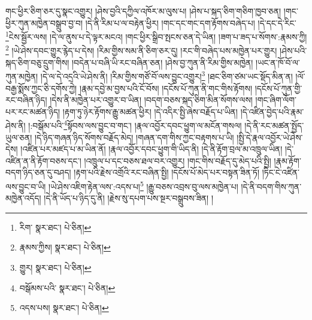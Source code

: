 གང་ཕྱིར་ཅིག་ཅར་དུ་སྣང་འགྱུར། །ཤེས་བྱའི་དཀྱིལ་འཁོར་མ་ལུས་པ། །ཤེས་པ་སྐད་ཅིག་གཅིག་ཁྱབ་ཅན། །གང་ཕྱིར་ཀུན་མཁྱེན་བསྒྲུབ་བྱ་བ། །དེ་ནི་རིམ་པ་ལ་བརྟེན་ཕྱིར། །གང་དང་གང་དག་རྟོགས་བཞེད་པ། །དེ་དང་དེ་རིང་\footnote{རིག་  སྣར་ཐང་།  པེ་ཅིན། }ངེས་སྦྱོར་ལས། །དེ་ལ་ནུས་པ་དེ་ལྟར་མངའ། །གང་ཕྱིར་སྒྲིབ་སྤངས་ཅན་དེ་ཡིན། །ཟག་པ་ཟད་པ་སོགས་:རྣམས་ཀྱི།\footnote{རྣམས་ཀྱིས།  སྣར་ཐང་།  པེ་ཅིན། } །ཡེ་ཤེས་དབང་གྱུར་རྙེད་པ་དེས། །རིམ་གྱིས་སམ་ནི་ཅིག་ཅར་དུ། །རང་གི་བཞེད་པས་མཁྱེན་པར་གྱུར། །ཤེས་པའི་སྐད་ཅིག་བཅུ་དྲུག་གིས། །བདེན་པ་བཞི་ཡི་རང་བཞིན་ཅན། །ཤེས་བྱ་ཀུན་ནི་རིམ་གྱིས་མཁྱེན། །ཡང་ན་ཁོ་བོ་ལ་ཀུན་མཁྱེན། །དེ་ལ་དེ་འདྲའི་ཡེ་ཤེས་ནི། །རིམ་གྱིས་གཙོ་བོ་ལས་བྱུང་འགྱུར།\footnote{གྱུར།  སྣར་ཐང་།  པེ་ཅིན། } །ཐང་ཅིག་ཙམ་ཡང་སྡོད་མིན་ན། །ལོ་བརྒྱ་སྨོས་ཀྱང་ཅི་དགོས་ཀྱེ། །རྣམ་དབྱེ་མ་བྱས་པའི་ངོ་བོས། །དངོས་པོ་ཀུན་ནི་གང་གིས་རྟོགས། །དངོས་པོ་ཀུན་གྱི་རང་བཞིན་ཉིད། །དེས་ནི་མཁྱེན་པར་འགྱུར་བ་ཡིན། །བདག་བཅས་སྐད་ཅིག་མིན་སོགས་ལས། །གང་ཞིག་ལོག་པར་རང་མཚན་ཉིད། །རྟག་ཏུ་ཉེར་རྟོགས་རྒྱུ་མཚན་ཕྱིར། །དེ་འདིར་སྤྱི་ཞེས་བརྗོད་པ་ཡིན། །དེ་འཛིན་བྱེད་པའི་རྣམ་ཤེས་ནི། །:བསྒོམ་པའི་\footnote{བསྒོམས་པའི་  སྣར་ཐང་།  པེ་ཅིན། }སྟོབས་ལས་བྱུང་བ་གང་། །རྣལ་འབྱོར་དབང་ཕྱུག་ལ་མངོན་གསལ། །དེ་ནི་རང་མཚན་སྤྱོད་ཡུལ་ཅན། །དེ་ཉིད་གཞན་ཉིད་སོགས་བརྗོད་མེད། །གཞན་དག་གིས་ཀྱང་བརྟགས་པ་ཡི། །སྤྱི་དེ་རྣལ་འབྱོར་ཡེ་ཤེས་དེས། །འཛིན་པར་མཛད་པ་མ་ཡིན་ནོ། །རྣལ་འབྱོར་དབང་ཕྱུག་གི་ཡིད་ནི། །དེ་ནི་རྟོག་བྲལ་མ་འཁྲུལ་ཡིན། །དེ་འཛིན་ན་ནི་རྟོག་བཅས་དང་། །འཁྲུལ་པ་དང་བཅས་ཐལ་བར་འགྱུར། །གང་གིས་བརྗོད་དུ་མེད་པའི་སྤྱི། །རྣམ་རྟོག་བདག་ཉིད་ཅན་དུ་བཤད། །རྟག་པའི་རྗེས་འགྲོའི་རང་བཞིན་སྤྱི། །དངོས་པོ་མེད་པར་བསྟན་ཟིན་ཏོ། །ཏིང་ངེ་འཛིན་ལས་བྱུང་བ་ཡི། །ཡེ་ཤེས་འཇིག་རྟེན་ལས་:འདས་པ།\footnote{འདས་པས།  སྣར་ཐང་།  པེ་ཅིན། } །རྒྱུ་བཅས་འབྲས་བུ་ལས་མཁྱེན་པ། །དེ་ནི་བདག་གིས་ཀུན་མཁྱེན་འདོད། །དེ་ནི་ཡོད་པ་ཉིད་དུ་ནི། །རྗེས་སུ་དཔག་པས་སྔར་བསྒྲུབས་ཟིན། །
